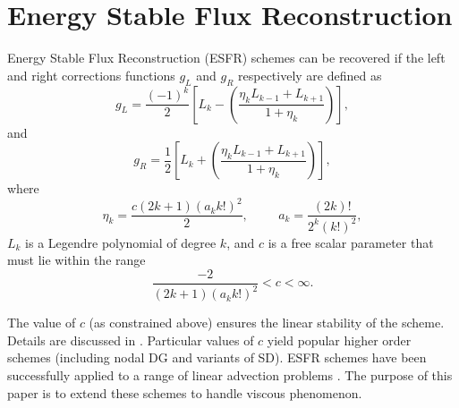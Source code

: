 \section{Energy Stable Flux Reconstruction}

\noindent Energy Stable Flux Reconstruction (ESFR) schemes can be recovered if the left and right corrections functions $g_L$ and $g_R$ respectively are defined as
\begin{equation}
g_L=\frac{(-1)^{k}}{2}\left[L_{k}-\left(\frac{\eta_{k}L_{k-1}+L_{k+1}}{1+\eta_k}\right)\right],
\label{final_left}
\end{equation}
and
\begin{equation}
g_R=\frac{1}{2}\left[L_{k}+\left(\frac{\eta_{k}L_{k-1}+L_{k+1}}{1+\eta_k}\right)\right],
\label{final_right}
\end{equation}
where
\begin{equation}
\eta_k=\frac{c(2k+1)(a_kk!)^2}{2},\hspace{1cm}a_{k}=\frac{(2k)!}{2^{k}(k!)^2},
\end{equation}
$L_k$ is a Legendre polynomial of degree $k$, and $c$ is a free scalar parameter that must lie within the range
\begin{equation}
\frac{-2}{(2k+1)(a_kk!)^2}<c<\infty.
\label{c_range}
\end{equation}

\noindent The value of $c$ (as constrained above) ensures the linear stability of the scheme. Details are discussed in \cite{Vincent10}. Particular values of $c$ yield popular higher order schemes (including nodal DG and variants of SD). ESFR schemes have been successfully applied to a range of linear advection problems \cite{Vincent10}. The purpose of this paper is to extend these schemes to handle viscous phenomenon. 